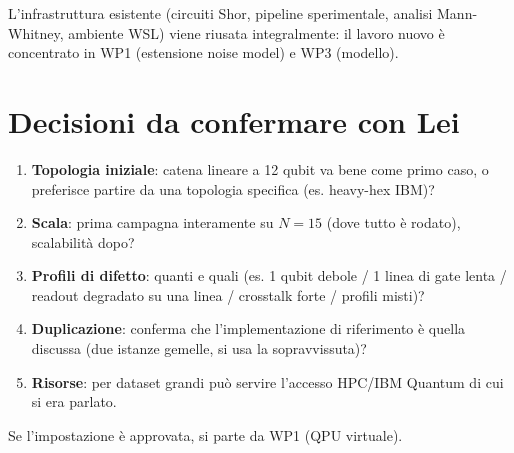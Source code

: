 \documentclass[11pt,a4paper]{article}
\begin{document}
L'infrastruttura esistente (circuiti Shor, pipeline sperimentale, analisi Mann-Whitney, ambiente WSL) viene riusata integralmente: il lavoro nuovo è concentrato in WP1 (estensione noise model) e WP3 (modello).

\section{Decisioni da confermare con Lei}
\begin{enumerate}[nosep]
    \item \textbf{Topologia iniziale}: catena lineare a 12 qubit va bene come primo caso, o preferisce partire da una topologia specifica (es. heavy-hex IBM)?
    \item \textbf{Scala}: prima campagna interamente su $N{=}15$ (dove tutto è rodato), scalabilità dopo?
    \item \textbf{Profili di difetto}: quanti e quali (es. 1 qubit debole / 1 linea di gate lenta / readout degradato su una linea / crosstalk forte / profili misti)?
    \item \textbf{Duplicazione}: conferma che l'implementazione di riferimento è quella discussa (due istanze gemelle, si usa la sopravvissuta)?
    \item \textbf{Risorse}: per dataset grandi può servire l'accesso HPC/IBM Quantum di cui si era parlato.
\end{enumerate}

\bigskip
\noindent Se l'impostazione è approvata, si parte da WP1 (QPU virtuale).
\end{document}
